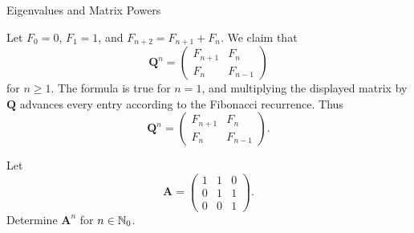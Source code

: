 \begin{expectedproblemgroup}{Eigenvalues and Matrix Powers}
        \begin{expectedsubsolution}
            Let $F_0=0$, $F_1=1$, and $F_{n+2}=F_{n+1}+F_n$. We claim that
            \[
                \mathbf{Q}^n
                =
                \begin{pmatrix}
                    F_{n+1} & F_n\\
                    F_n & F_{n-1}
                \end{pmatrix}
            \]
            for $n\geq1$. The formula is true for $n=1$, and multiplying the
            displayed matrix by $\mathbf{Q}$ advances every entry according to the
            Fibonacci recurrence. Thus
            \[
                \boxed{
                    \mathbf{Q}^n
                    =
                    \begin{pmatrix}
                        F_{n+1} & F_n\\
                        F_n & F_{n-1}
                    \end{pmatrix}
                }.
            \]
        \end{expectedsubsolution}


        \begin{expectedsubproblem}
            Let
            \[
                \mathbf{A}
                =
                \begin{pmatrix}
                    1 & 1 & 0\\
                    0 & 1 & 1\\
                    0 & 0 & 1
                \end{pmatrix}.
            \]
            Determine $\mathbf{A}^n$ for $n\in\mathbb{N}_0$.
        \end{expectedsubproblem}


\end{expectedproblemgroup}
